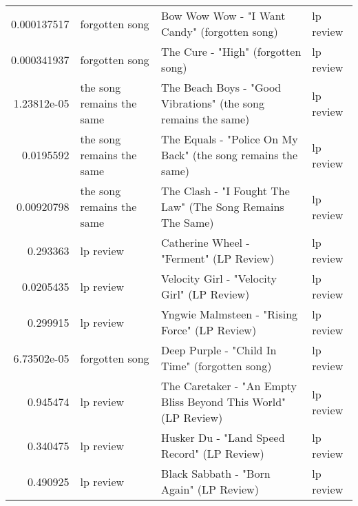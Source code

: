 \documentclass[letterpaper,10pt]{article}
\begin{document}
\begin{table}[H]
\begin{adjustbox}{max width=\linewidth}
\begin{tabular}{rlll}
  0.000137517 & forgotten song            & Bow Wow Wow - "I Want Candy" (forgotten song)                                                                & lp review                 \\
  0.000341937 & forgotten song            & The Cure - "High" (forgotten song)                                                                           & lp review                 \\
  1.23812e-05 & the song remains the same & The Beach Boys - "Good Vibrations" (the song remains the same)                                               & lp review                 \\
  0.0195592   & the song remains the same & The Equals - "Police On My Back" (the song remains the same)                                                 & lp review                 \\
  0.00920798  & the song remains the same & The Clash - "I Fought The Law" (The Song Remains The Same)                                                   & lp review                 \\
  0.293363    & lp review                 & Catherine Wheel - "Ferment" (LP Review)                                                                      & lp review                 \\
  0.0205435   & lp review                 & Velocity Girl - "Velocity Girl" (LP Review)                                                                  & lp review                 \\
  0.299915    & lp review                 & Yngwie Malmsteen - "Rising Force" (LP Review)                                                                & lp review                 \\
  6.73502e-05 & forgotten song            & Deep Purple - "Child In Time" (forgotten song)                                                               & lp review                 \\
  0.945474    & lp review                 & The Caretaker - "An Empty Bliss Beyond This World" (LP Review)                                               & lp review                 \\
  0.340475    & lp review                 & Husker Du - "Land Speed Record" (LP Review)                                                                  & lp review                 \\
  0.490925    & lp review                 & Black Sabbath - "Born Again" (LP Review)                                                                     & lp review                 \\

\end{tabular}
\end{adjustbox}
\end{table}
\end{document}
